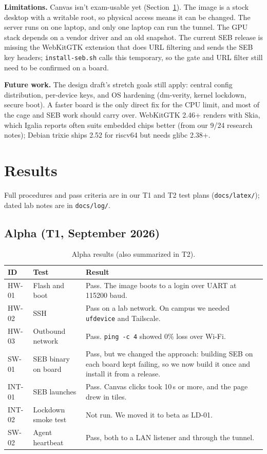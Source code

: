 \documentclass[11pt]{article}
\begin{document}
\textbf{Limitations.} Canvas isn't exam-usable yet (Section~\ref{sec:results}). The image is a stock desktop with a writable root, so physical access means it can be changed. The server runs on one laptop, and only one laptop can run the tunnel. The GPU stack depends on a vendor driver and an old snapshot. The current SEB release is missing the WebKitGTK extension that does URL filtering and sends the SEB key headers; \texttt{install-seb.sh} calls this temporary, so the gate and URL filter still need to be confirmed on a board.

\textbf{Future work.} The design draft's stretch goals still apply: central config distribution, per-device keys, and OS hardening (dm-verity, kernel lockdown, secure boot). A faster board is the only direct fix for the CPU limit, and most of the cage and SEB work should carry over. WebKitGTK 2.46+ renders with Skia, which Igalia reports often suits embedded chips better (from our 9/24 research notes); Debian trixie ships 2.52 for riscv64 but needs glibc 2.38+.

\section{Results}
\label{sec:results}

Full procedures and pass criteria are in our T1 and T2 test plans (\texttt{docs/latex/}); dated lab notes are in \texttt{docs/log/}.

\subsection{Alpha (T1, September 2026)}
\begin{table}[H]
\centering
\footnotesize
\begin{tabularx}{\textwidth}{@{}p{}p{}X@{}}
\toprule
\textbf{ID} & \textbf{Test} & \textbf{Result} \\
\midrule
HW-01 & Flash and boot & Pass. The image boots to a login over UART at 115200 baud. \\
HW-02 & SSH & Pass on a lab network. On campus we needed \texttt{ufdevice} and Tailscale. \\
HW-03 & Outbound network & Pass. \texttt{ping -c 4} showed 0\% loss over Wi-Fi. \\
SW-01 & SEB binary on board & Pass, but we changed the approach: building SEB on each board kept failing, so we now build it once and install it from a release. \\
INT-01 & SEB launches & Pass. Canvas clicks took 10\,s or more, and the page drew in tiles. \\
INT-02 & Lockdown smoke test & Not run. We moved it to beta as LD-01. \\
SW-02 & Agent heartbeat & Pass, both to a LAN listener and through the tunnel. \\
\bottomrule
\end{tabularx}
\caption{Alpha results (also summarized in T2).}
\end{table}
\end{document}
